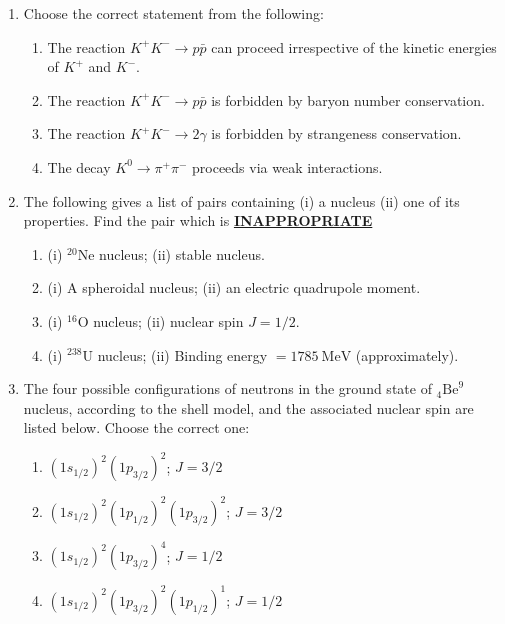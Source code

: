 \documentclass[journal,12pt,onecolumn]{IEEEtran}
\theoremstyle{remark}
\begin{document}
\begin{enumerate}
\item Choose the correct statement from the following:
\hfill{}
\begin{enumerate}
    \item The reaction $K^+ K^- \to p\bar{p}$ can proceed irrespective of the kinetic energies of $K^+$ and $K^-$.
    \item The reaction $K^+ K^- \to p\bar{p}$ is forbidden by baryon number conservation.
    \item The reaction $K^+ K^- \to 2\gamma$ is forbidden by strangeness conservation.
    \item The decay $K^0 \to \pi^+ \pi^-$ proceeds via weak interactions.
\end{enumerate}

\item The following gives a list of pairs containing (i) a nucleus (ii) one of its properties. Find the pair which is \underline{\textbf{INAPPROPRIATE}}
\hfill{}
\begin{enumerate}
    \item (i) ${}^{20}\mathrm{Ne}$ nucleus; \quad (ii) stable nucleus.
    \item (i) A spheroidal nucleus; \quad (ii) an electric quadrupole moment.
    \item (i) ${}^{16}\mathrm{O}$ nucleus; \quad (ii) nuclear spin $J=1/2$.
    \item (i) ${}^{238}\mathrm{U}$ nucleus; \quad (ii) Binding energy $=1785\ \mathrm{MeV}$ (approximately).
\end{enumerate}


\item The four possible configurations of neutrons in the ground state of  $_4\mathrm{Be}^9$ nucleus, according to the shell model, and the associated nuclear spin are listed below. Choose the correct one:
\hfill{}
\begin{multicols}{2}
\begin{enumerate}
    \item $(1s_{1/2})^2(1p_{3/2})^2$; \quad $J=3/2$
    \item $(1s_{1/2})^2(1p_{1/2})^2(1p_{3/2})^2$; \quad $J=3/2$
    \item $(1s_{1/2})^2(1p_{3/2})^4$; \quad $J=1/2$
    \item $(1s_{1/2})^2(1p_{3/2})^2(1p_{1/2})^1$; \quad $J=1/2$
\end{enumerate}
\end{multicols}


\end{enumerate}
\end{document}
